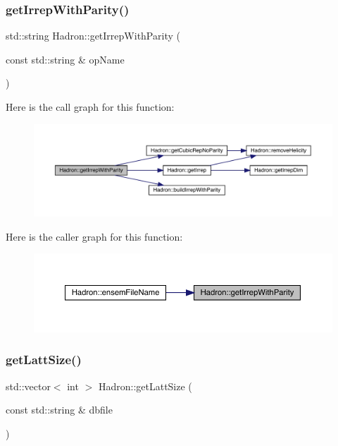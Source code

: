 \subsubsection{\texorpdfstring{getIrrepWithParity()}{getIrrepWithParity()}}
{\footnotesize\ttfamily std\+::string Hadron\+::get\+Irrep\+With\+Parity (\begin{DoxyParamCaption}\item[{const std\+::string \&}]{op\+Name }\end{DoxyParamCaption})}

Here is the call graph for this function\+:
\nopagebreak
\begin{figure}[H]
\begin{center}
\leavevmode
\includegraphics[width=350pt]{d1/daf/namespaceHadron_a0f40c5d7e590d17294e0a27e231c0a4b_cgraph}
\end{center}
\end{figure}
Here is the caller graph for this function\+:
\nopagebreak
\begin{figure}[H]
\begin{center}
\leavevmode
\includegraphics[width=350pt]{d1/daf/namespaceHadron_a0f40c5d7e590d17294e0a27e231c0a4b_icgraph}
\end{center}
\end{figure}
\mbox{\label{namespaceHadron_aa639c858514f322eb7ee4c074924746a}} 
\subsubsection{\texorpdfstring{getLattSize()}{getLattSize()}}
{\footnotesize\ttfamily std\+::vector$<$ int $>$ Hadron\+::get\+Latt\+Size (\begin{DoxyParamCaption}\item[{const std\+::string \&}]{dbfile }\end{DoxyParamCaption})}



